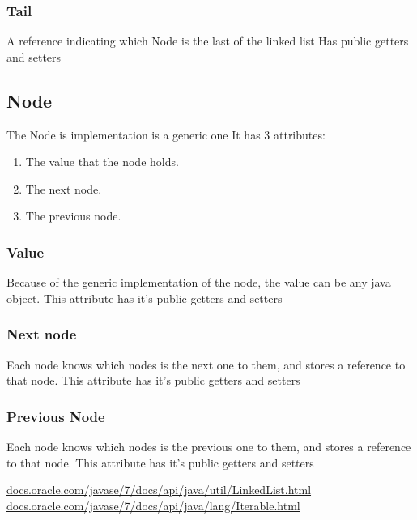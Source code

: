 \documentclass{article}
\begin{document}
\subsubsection{Tail}
A reference indicating which Node is the last of the linked list
Has public getters and setters


\subsection{Node}
The Node is implementation is a generic one
It has 3 attributes:
\begin{enumerate}
    \item The value that the node holds.
    \item The next node.
    \item The previous node.
\end{enumerate}

\subsubsection{Value}
Because of the generic implementation of the node, the value can be any java object.
This attribute has it's public getters and setters

\subsubsection{Next node}
Each node knows which nodes is the next one to them, and stores a reference to that node.
This attribute has it's public getters and setters
\subsubsection{Previous Node}
Each node knows which nodes is the previous one to them, and stores a reference to that node.
This attribute has it's public getters and setters









\begin{list}
    \url{docs.oracle.com/javase/7/docs/api/java/util/LinkedList.html}
    \url{docs.oracle.com/javase/7/docs/api/java/lang/Iterable.html}
\end{list}
\end{document}
